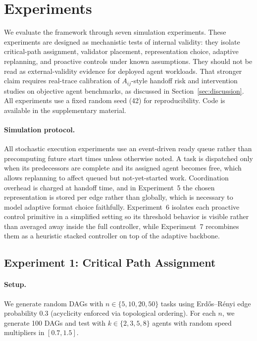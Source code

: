 \documentclass[10pt, twocolumn]{article}
\begin{document}
\section{Experiments}
\label{sec:experiments}

We evaluate the framework through seven simulation experiments. These experiments are designed as mechanistic tests of internal validity: they isolate critical-path assignment, validator placement, representation choice, adaptive replanning, and proactive controls under known assumptions. They should not be read as external-validity evidence for deployed agent workloads. That stronger claim requires real-trace calibration of $A_{ij}$-style handoff risk and intervention studies on objective agent benchmarks, as discussed in Section~\ref{sec:discussion}. All experiments use a fixed random seed (42) for reproducibility. Code is available in the supplementary material.

\paragraph{Simulation protocol.}
All stochastic execution experiments use an event-driven ready queue rather than precomputing future start times unless otherwise noted. A task is dispatched only when its predecessors are complete and its assigned agent becomes free, which allows replanning to affect queued but not-yet-started work. Coordination overhead is charged at handoff time, and in Experiment~5 the chosen representation is stored per edge rather than globally, which is necessary to model adaptive format choice faithfully. Experiment~6 isolates each proactive control primitive in a simplified setting so its threshold behavior is visible rather than averaged away inside the full controller, while Experiment~7 recombines them as a heuristic stacked controller on top of the adaptive backbone.

\subsection{Experiment 1: Critical Path Assignment}

\paragraph{Setup.} We generate random DAGs with $n \in \{5, 10, 20, 50\}$ tasks using Erd\H{o}s--R\'{e}nyi edge probability 0.3 (acyclicity enforced via topological ordering). For each $n$, we generate 100 DAGs and test with $k \in \{2, 3, 5, 8\}$ agents with random speed multipliers in $[0.7, 1.5]$.
\end{document}
